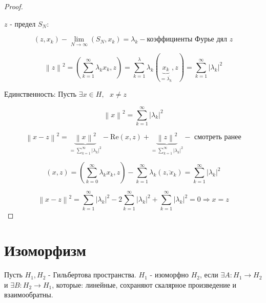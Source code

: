 \documentclass[12pt, a4paper]{report}
\begin{document}
\begin{proof}
    \[  \] 

    \( z  \)  - предел \( S_N \): 

    \[ (z , x_k ) - \lim_{N  \to \infty} (S_N , x_k )  = \lambda_k - \text{коэффициенты Фурье дял } z \] 

    \[ \left\lVert z  \right\rVert   ^2 = \left(  \sum_{k =1}^{ \infty  } \lambda_k x_k , z       \right) = \sum_{k =1}^{\lambda } \lambda_k ( \underbrace{x_k}_{=\overline{\lambda_k}  }, z ) = \sum_{k =1} ^{ \infty  } \left\lvert \lambda_k \right\rvert ^2    \] 

    Единственность: Пусть \( \exists  x \in  H , \text{ }  x \neq z  \) 

    \[ \left\lVert x   \right\rVert ^2 = \sum_{k =1}^{ \infty  } \left\lvert \lambda_k       \right\rvert ^2   \] 

    \[ \left\lVert  x - z  \right\rVert ^2 =\underbrace{ \left\lVert x \right\rVert  ^2}_{=\sum_{k =1}^{\infty  }\left\lvert \lambda_k   \right\rvert ^2  } - \mathrm{Re } (x,z )  + \underbrace{ \left\lVert z \right\rVert  ^2}_{=\sum_{k =1}^{\infty  }\left\lvert \lambda_k   \right\rvert ^2  } - \text{ смотреть ранее} \] 

    \[ (x, z ) =\left(  \sum_{k =0 }^{ \infty  } \lambda_k x_k , z   \right) - \sum _{k =1} ^{ \infty  } \lambda_k (\overline{z, x_k}  ) = \sum_{k =1}^{ \infty } \left\lvert \lambda_k      \right\rvert ^2  \]  

    \[ \left\lVert x -z  \right\rVert ^2 = \sum _{k =1}^{ \infty  } \left\lvert \lambda_k \right\rvert ^2 - 2 \sum  _{k =1}^{ \infty  } \left\lvert \lambda_k    \right\rvert ^2 + \sum _{k =1} ^{ \infty  } \left\lvert \lambda_k \right\rvert ^2 = 0 \Rightarrow x = z\] 
\end{proof}

\section{Изоморфизм}

\begin{definition}
    Пусть \( H_1, H_2 \) - Гильбертова пространства. \( H_1  \) - изоморфно \( H_2 \), если \( \exists A : H_1 \to H_2 \) и \( \exists B : H_2 \to H_1 \), которые: линейные, сохраняют скалярное произведение и взаимообратны. 
\end{definition}


\ifdefined\mainfile
\else
\end{document}
